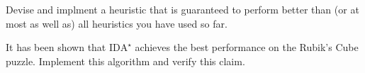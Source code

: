 \documentclass[a4paper]{article}
\begin{document}
{\ex{}\label{ex:ex9} Devise and implment a heuristic that is guaranteed to perform better than (or at most as well as) all heuristics you have used so far.\vspace{0.1cm}}

{\ex{}\label{ex:ex10} It has been shown that $\text{IDA}^\star$ achieves the best performance on the Rubik's Cube puzzle.  Implement this algorithm and verify this claim.\vspace{0.1cm}}

%
%
\end{document}
